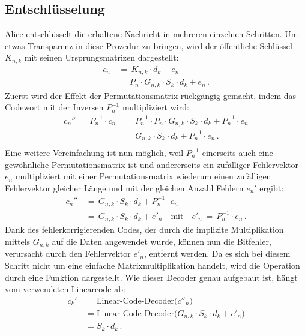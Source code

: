 \subsection{Entschlüsselung
\label{mceliece:section:entschl}}
Alice entschlüsselt die erhaltene Nachricht in mehreren einzelnen Schritten.
Um etwas Transparenz in diese Prozedur zu bringen, wird der öffentliche Schlüssel $K_{n,k}$ mit seinen Ursprungsmatrizen dargestellt:
\begin{align*}
    c_n\,&=\,K_{n,k}\cdot d_k + e_n \\
    &= P_{n}\cdot G_{n,k}\cdot S_{k}\cdot d_k + e_n\,.
\end{align*}
Zuerst wird der Effekt der Permutationsmatrix rückgängig gemacht,
indem das Codewort mit der Inversen $P_n^{-1}$ multipliziert wird:
\begin{align*}
    c_{n}''\,=\,P_n^{-1}\cdot c_n\,&= P_n^{-1}\cdot P_{n}\cdot G_{n,k}\cdot S_{k}\cdot d_k + P_n^{-1}\cdot e_n \\
                                         &= G_{n,k}\cdot S_{k}\cdot d_k + P_n^{-1}\cdot e_n\,. \\
\end{align*}
Eine weitere Vereinfachung ist nun möglich,
weil $P_n^{-1}$ einerseits auch eine gewöhnliche Permutationsmatrix ist
und andererseits ein zufälliger Fehlervektor $e_n$ multipliziert mit einer Permutationsmatrix
wiederum einen zufälligen Fehlervektor gleicher Länge und mit der gleichen Anzahl Fehlern $e_n'$ ergibt:
\begin{align*}
    c_{n}''\,&=\,G_{n,k}\cdot S_{k}\cdot d_k + P_n^{-1}\cdot e_n \\
             &=\,G_{n,k}\cdot S_{k}\cdot d_k + e'_n \quad \text{mit} \quad
    e'_n\,=\,P_n^{-1}\cdot e_n\,.
\end{align*}
Dank des fehlerkorrigierenden Codes, der durch die implizite Multiplikation mittels $G_{n,k}$ auf die Daten angewendet wurde,
können nun die Bitfehler, verursacht durch den Fehlervektor $e'_n$,
entfernt werden.
Da es sich bei diesem Schritt nicht um eine einfache Matrixmultiplikation handelt,
wird die Operation durch eine Funktion dargestellt.
Wie dieser Decoder genau aufgebaut ist,
hängt vom verwendeten Linearcode ab:
\begin{align*}
    c_{k}'\,&=\text{Linear-Code-Decoder($c''_n$)}\\
            &=\text{Linear-Code-Decoder($G_{n,k}\cdot S_{k}\cdot d_k + e'_n$)}\\
            &=S_{k}\cdot d_k\,.
\end{align*}
